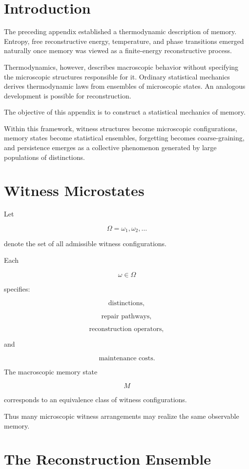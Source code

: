 \documentclass[12pt,oneside]{book}
\theoremstyle{plain} \newtheorem{theorem}{Theorem}[chapter] \newtheorem{lemma}[theorem]{Lemma} \newtheorem{proposition}[theorem]{Proposition} \newtheorem{corollary}[theorem]{Corollary}
\theoremstyle{definition} \newtheorem{definition}[theorem]{Definition} \newtheorem{axiom}[theorem]{Axiom} \newtheorem{construction}[theorem]{Construction}
\theoremstyle{remark} \newtheorem{remark}[theorem]{Remark} \newtheorem{example}[theorem]{Example}
\begin{document}
\section{Introduction}

The preceding appendix established a thermodynamic description of memory. Entropy, free reconstructive energy, temperature, and phase transitions emerged naturally once memory was viewed as a finite-energy reconstructive process.

Thermodynamics, however, describes macroscopic behavior without specifying the microscopic structures responsible for it. Ordinary statistical mechanics derives thermodynamic laws from ensembles of microscopic states. An analogous development is possible for reconstruction.

The objective of this appendix is to construct a statistical mechanics of memory.

Within this framework, witness structures become microscopic configurations, memory states become statistical ensembles, forgetting becomes coarse-graining, and persistence emerges as a collective phenomenon generated by large populations of distinctions.

\section{Witness Microstates}

Let

\[
\Omega
=
{\omega_1,\omega_2,\ldots}
\]

denote the set of all admissible witness configurations.

Each

\[
\omega
\in
\Omega
\]

specifies:

\[
\text{distinctions},
\]

\[
\text{repair pathways},
\]

\[
\text{reconstruction operators},
\]

and

\[
\text{maintenance costs}.
\]

The macroscopic memory state

\[
M
\]

corresponds to an equivalence class of witness configurations.

Thus many microscopic witness arrangements may realize the same observable memory.

\section{The Reconstruction Ensemble}
\end{document}
